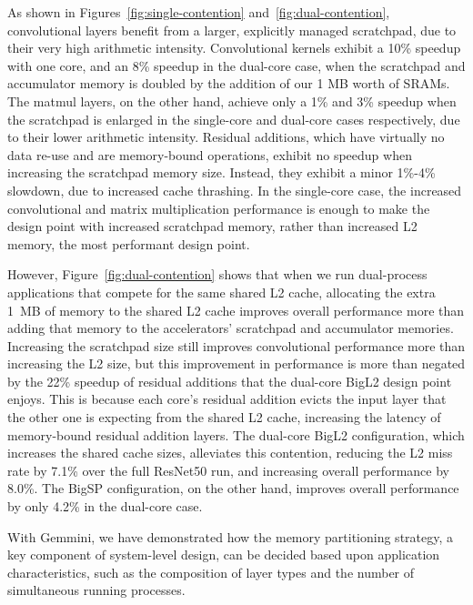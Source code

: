 As shown in Figures~\ref{fig:single-contention} and~\ref{fig:dual-contention}, convolutional layers benefit from a larger, explicitly managed scratchpad, due to their very high arithmetic intensity. Convolutional kernels exhibit a 10\% speedup with one core, and an 8\% speedup in the dual-core case, when the scratchpad and accumulator memory is doubled by the addition of our 1 MB worth of SRAMs. The matmul layers, on the other hand, achieve only a 1\% and 3\% speedup when the scratchpad is enlarged in the single-core and dual-core cases respectively, due to their lower arithmetic intensity. Residual additions, which have virtually no data re-use and are memory-bound operations, exhibit no speedup when increasing the scratchpad memory size. Instead, they exhibit a minor 1\%-4\% slowdown, due to increased cache thrashing. In the single-core case, the increased convolutional and matrix multiplication performance is enough to make the design point with increased scratchpad memory, rather than increased L2 memory, the most performant design point.


However, Figure~\ref{fig:dual-contention} shows that when we run dual-process applications that compete for the same shared L2 cache, allocating the extra 1~MB of memory to the shared L2 cache improves overall performance more than adding that memory to the accelerators' scratchpad and accumulator memories. Increasing the scratchpad size still improves convolutional performance more than increasing the L2 size, but this improvement in performance is more than negated by the 22\% speedup of residual additions that the dual-core BigL2 design point enjoys. This is because each core's residual addition evicts the input layer that the other one is expecting from the shared L2 cache, increasing the latency of memory-bound residual addition layers. The dual-core BigL2 configuration, which increases the shared cache sizes, alleviates this contention, reducing the L2 miss rate by 7.1\% over the full ResNet50 run, and increasing overall performance by 8.0\%. The BigSP configuration, on the other hand, improves overall performance by only 4.2\% in the dual-core case.


With Gemmini, we have demonstrated how the memory partitioning strategy, a key component of system-level design, can be decided based upon application characteristics, such as the composition of layer types and the number of simultaneous running processes.

